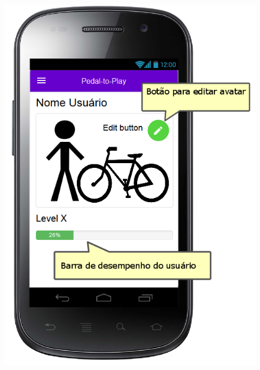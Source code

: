 \begin{figure}[h]
\centering
\begin{minipage}{.5\textwidth}
  \centerline{\includegraphics[width=.8\linewidth]{figuras/Visualizacao.png}}
  \label{fig:homeProto}
\end{minipage}%
\begin{minipage}{.5\textwidth}

\end{minipage}
\end{figure}
